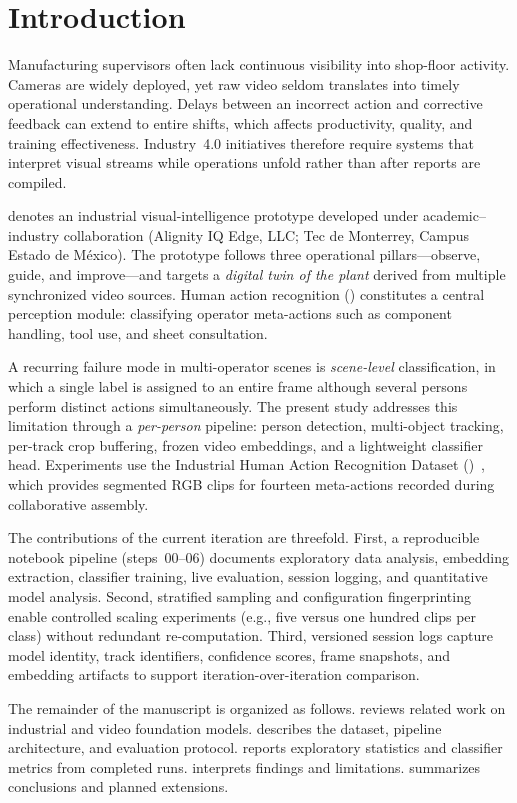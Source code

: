\section{Introduction}
\label{sec:introduction}

Manufacturing supervisors often lack continuous visibility into shop-floor activity.
Cameras are widely deployed, yet raw video seldom translates into timely operational understanding.
Delays between an incorrect action and corrective feedback can extend to entire shifts, which affects productivity, quality, and training effectiveness.
Industry~4.0 initiatives therefore require systems that interpret visual streams while operations unfold rather than after reports are compiled.

\visionops{} denotes an industrial visual-intelligence prototype developed under academic--industry collaboration (Alignity IQ Edge, LLC; Tec de Monterrey, Campus Estado de M{\'e}xico).
The prototype follows three operational pillars---observe, guide, and improve---and targets a \emph{digital twin of the plant} derived from multiple synchronized video sources.
Human action recognition (\har{}) constitutes a central perception module: classifying operator meta-actions such as component handling, tool use, and sheet consultation.

A recurring failure mode in multi-operator scenes is \emph{scene-level} classification, in which a single label is assigned to an entire frame although several persons perform distinct actions simultaneously.
The present study addresses this limitation through a \emph{per-person} pipeline: person detection, multi-object tracking, per-track crop buffering, frozen video embeddings, and a lightweight classifier head.
Experiments use the Industrial Human Action Recognition Dataset (\inhard{})~\cite{gaspar2020inhard}, which provides segmented RGB clips for fourteen meta-actions recorded during collaborative assembly.

The contributions of the current iteration are threefold.
First, a reproducible notebook pipeline (steps~00--06) documents exploratory data analysis, embedding extraction, classifier training, live evaluation, session logging, and quantitative model analysis.
Second, stratified sampling and configuration fingerprinting enable controlled scaling experiments (e.g., five versus one hundred clips per class) without redundant re-computation.
Third, versioned session logs capture model identity, track identifiers, confidence scores, frame snapshots, and embedding artifacts to support iteration-over-iteration comparison.

The remainder of the manuscript is organized as follows.
 reviews related work on industrial \har{} and video foundation models.
 describes the dataset, pipeline architecture, and evaluation protocol.
 reports exploratory statistics and classifier metrics from completed runs.
 interprets findings and limitations.
 summarizes conclusions and planned extensions.

